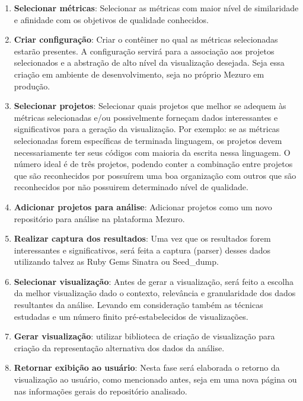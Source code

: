 \begin{enumerate}
  \item \textbf{Selecionar métricas}: Selecionar as métricas com maior nível de
  similaridade e afinidade com os objetivos de qualidade conhecidos.

  \item \textbf{Criar configuração}: Criar o contêiner no qual as métricas
  selecionadas estarão presentes. A configuração servirá para a associação aos
  projetos selecionados e a abstração de alto nível da visualização desejada.
  Seja essa criação em ambiente de desenvolvimento, seja no próprio Mezuro em
  produção.

  \item \textbf{Selecionar projetos}: Selecionar quais projetos que melhor se
  adequem às métricas selecionadas e/ou possivelmente forneçam dados
  interessantes e significativos para a geração da visualização. Por exemplo:
  se as métricas selecionadas forem específicas de terminada linguagem, os
  projetos devem necessariamente ter seus códigos com maioria da escrita
  nessa linguagem. O número ideal é de três projetos, podendo conter a
  combinação entre projetos que são reconhecidos por possuírem uma boa
  organização com outros que são reconhecidos por não possuirem determinado
  nível de qualidade.

  \item \textbf{Adicionar projetos para análise}: Adicionar projetos como um
  novo repositório para análise na plataforma Mezuro.

  \item \textbf{Realizar captura dos resultados}: Uma vez que os resultados
  forem interessantes e significativos, será feita a captura (parser) desses
  dados utilizando talvez as Ruby Gems Sinatra ou Seed\_dump.

  \item \textbf{Selecionar visualização}: Antes de gerar a visualização, será
  feito a escolha da melhor visualização dado o contexto, relevância e
  granularidade dos dados resultantes da análise. Levando em consideração também
  as técnicas estudadas e um número finito pré-estabelecidos de visualizações.

  \item \textbf{Gerar visualização}: utilizar biblioteca de criação de
  visualização para criação da representação alternativa dos dados da análise.

  \item \textbf{Retornar exibição ao usuário}: Nesta fase será elaborada o
  retorno da visualização ao usuário, como mencionado antes, seja em uma nova
  página ou nas informações gerais do repositório analisado.
\end{enumerate}

